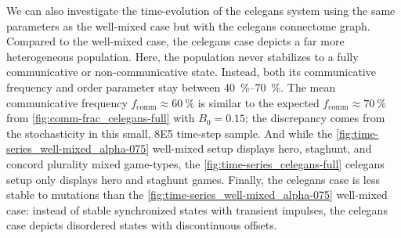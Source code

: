 \documentclass[pdflatex,lineno,referee,sn-nature]{sn-jnl}
\begin{document}
We can also investigate the time-evolution of the \gls{celegans} system
using the same parameters as the
well-mixed case but with the \gls{celegans} connectome graph.
Compared to the well-mixed case,
the  \gls{celegans} case
depicts a far more heterogeneous population.
Here, the population never stabilizes
to a fully communicative or non-communicative state.
Instead, both its communicative frequency and order parameter
stay between \SIrange{40}{70}{\percent}.
The mean communicative frequency $f_{\text{comm}} \approx \SI{60}{\percent}$
is similar to the expected $f_{\text{comm}} \approx \SI{70}{\percent}$
from \cref{fig:comm-frac_celegans-full} with $B_0 = 0.15$;
the discrepancy comes from the stochasticity
in this small, \num{8E5} time-step sample.
And while the \cref{fig:time-series_well-mixed_alpha-075} well-mixed setup
displays hero, staghunt, and concord plurality mixed game-types,
the \cref{fig:time-series_celegans-full} \gls{celegans} setup
only displays hero and staghunt games.
Finally, the \gls{celegans} case is less stable to mutations
than the \cref{fig:time-series_well-mixed_alpha-075} well-mixed case:
instead of stable synchronized states with transient impulses,
the \gls{celegans} case depicts disordered states with discontinuous offsets.
\end{document}
